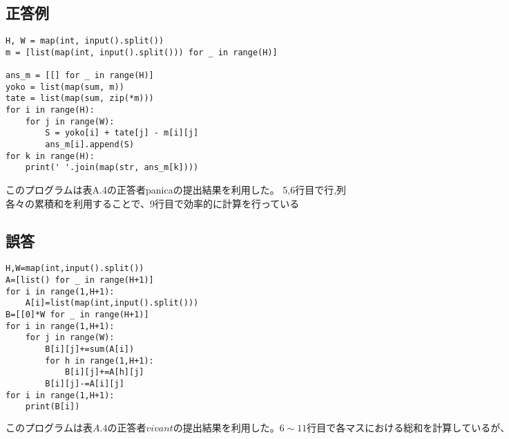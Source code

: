 \subsection{正答例}
\begin{lstlisting}
H, W = map(int, input().split())
m = [list(map(int, input().split())) for _ in range(H)]
    
ans_m = [[] for _ in range(H)]
yoko = list(map(sum, m))
tate = list(map(sum, zip(*m)))
for i in range(H):
    for j in range(W):
        S = yoko[i] + tate[j] - m[i][j]
        ans_m[i].append(S)
for k in range(H):
    print(' '.join(map(str, ans_m[k])))
\end{lstlisting}
このプログラムは表A.4の正答者panicaの提出結果を利用した。
5,6行目で行,列各々の累積和を利用することで、9行目で効率的に計算を行っている\\

\subsection{誤答}
\begin{lstlisting}
H,W=map(int,input().split())
A=[list() for _ in range(H+1)]
for i in range(1,H+1):
    A[i]=list(map(int,input().split()))
B=[[0]*W for _ in range(H+1)]
for i in range(1,H+1):
    for j in range(W):
        B[i][j]+=sum(A[i])
        for h in range(1,H+1):
            B[i][j]+=A[h][j]
        B[i][j]-=A[i][j]
for i in range(1,H+1):
    print(B[i])
\end{lstlisting}

\begin{math}
このプログラムは表A.4の正答者vivantの提出結果を利用した。
6\sim11行目で各マスにおける総和を計算しているが、
これでは計算時間が掛かり過ぎてしまうため、実行時間が間に合わない。
\end{math}


